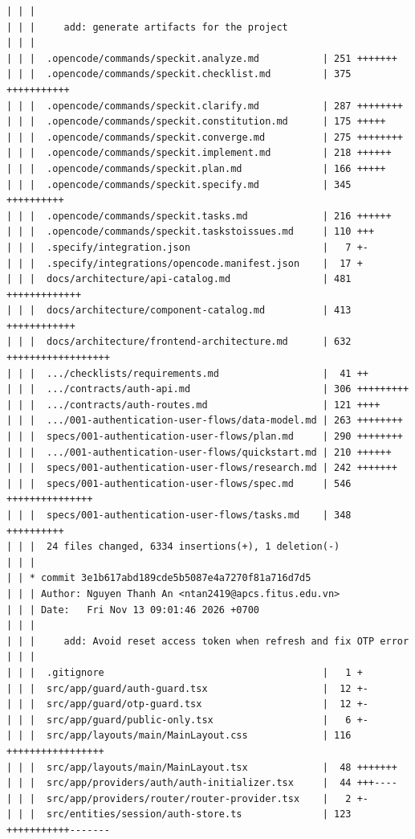 \documentclass[12pt]{article}
\begin{document}
\begin{lstlisting}[numbers=none,breaklines=true]
| | |
| | |     add: generate artifacts for the project
| | |
| | |  .opencode/commands/speckit.analyze.md           | 251 +++++++
| | |  .opencode/commands/speckit.checklist.md         | 375 +++++++++++
| | |  .opencode/commands/speckit.clarify.md           | 287 ++++++++
| | |  .opencode/commands/speckit.constitution.md      | 175 +++++
| | |  .opencode/commands/speckit.converge.md          | 275 ++++++++
| | |  .opencode/commands/speckit.implement.md         | 218 ++++++
| | |  .opencode/commands/speckit.plan.md              | 166 +++++
| | |  .opencode/commands/speckit.specify.md           | 345 ++++++++++
| | |  .opencode/commands/speckit.tasks.md             | 216 ++++++
| | |  .opencode/commands/speckit.taskstoissues.md     | 110 +++
| | |  .specify/integration.json                       |   7 +-
| | |  .specify/integrations/opencode.manifest.json    |  17 +
| | |  docs/architecture/api-catalog.md                | 481 +++++++++++++
| | |  docs/architecture/component-catalog.md          | 413 ++++++++++++
| | |  docs/architecture/frontend-architecture.md      | 632 ++++++++++++++++++
| | |  .../checklists/requirements.md                  |  41 ++
| | |  .../contracts/auth-api.md                       | 306 +++++++++
| | |  .../contracts/auth-routes.md                    | 121 ++++
| | |  .../001-authentication-user-flows/data-model.md | 263 ++++++++
| | |  specs/001-authentication-user-flows/plan.md     | 290 ++++++++
| | |  .../001-authentication-user-flows/quickstart.md | 210 ++++++
| | |  specs/001-authentication-user-flows/research.md | 242 +++++++
| | |  specs/001-authentication-user-flows/spec.md     | 546 +++++++++++++++
| | |  specs/001-authentication-user-flows/tasks.md    | 348 ++++++++++
| | |  24 files changed, 6334 insertions(+), 1 deletion(-)
| | |
| | * commit 3e1b617abd189cde5b5087e4a7270f81a716d7d5
| | | Author: Nguyen Thanh An <ntan2419@apcs.fitus.edu.vn>
| | | Date:   Fri Nov 13 09:01:46 2026 +0700
| | |
| | |     add: Avoid reset access token when refresh and fix OTP error
| | |
| | |  .gitignore                                      |   1 +
| | |  src/app/guard/auth-guard.tsx                    |  12 +-
| | |  src/app/guard/otp-guard.tsx                     |  12 +-
| | |  src/app/guard/public-only.tsx                   |   6 +-
| | |  src/app/layouts/main/MainLayout.css             | 116 +++++++++++++++++
| | |  src/app/layouts/main/MainLayout.tsx             |  48 +++++++
| | |  src/app/providers/auth/auth-initializer.tsx     |  44 +++----
| | |  src/app/providers/router/router-provider.tsx    |   2 +-
| | |  src/entities/session/auth-store.ts              | 123 +++++++++++-------

\end{lstlisting}
\end{document}
